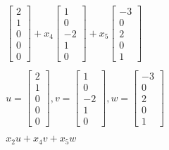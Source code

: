 \documentclass{article}
\begin{document}
\[\begin{gathered}
\begin{bmatrix}
      2\\
      1\\
      0\\
      0\\
      0
    \end{bmatrix} +
    x_4\begin{bmatrix}
      1\\
      0\\
      -2\\
      1\\
      0
    \end{bmatrix} +
    x_5\begin{bmatrix}
      -3\\
      0\\
      2\\
      0\\
      1
    \end{bmatrix}\\
    ~\\
    u=\begin{bmatrix}
      2\\
      1\\
      0\\
      0\\
      0
    \end{bmatrix},
    v=\begin{bmatrix}
      1\\
      0\\
      -2\\
      1\\
      0
    \end{bmatrix},
    w=\begin{bmatrix}
      -3\\
      0\\
      2\\
      0\\
      1
    \end{bmatrix}\\
    ~\\
    \boxed{x_2u+x_4v+x_5w}
    \end{gathered}
  \]
\end{document}
